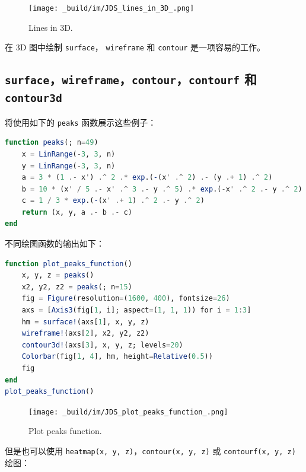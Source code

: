 \documentclass[
  notoc %
]{tufte-book}
\newcommand{\passthrough}[1]{#1}
\begin{document}
\begin{figure}
\hypertarget{fig:lines_in_3D}{%
\centering
\texttt{[image: \_build/im/JDS\_lines\_in\_3D\_.png]}
\caption{Lines in 3D.}\label{fig:lines_in_3D}
}
\end{figure}

在 3D 图中绘制 \passthrough{\lstinline!surface!}，
\passthrough{\lstinline!wireframe!} 和 \passthrough{\lstinline!contour!}
是一项容易的工作。

\hypertarget{surfacewireframecontourcontourf-ux548c-contour3d}{%
\subsection{\texorpdfstring{\texttt{surface}，\texttt{wireframe}，\texttt{contour}，\texttt{contourf}
和
\texttt{contour3d}}{surface，wireframe，contour，contourf 和 contour3d}}\label{surfacewireframecontourcontourf-ux548c-contour3d}}

将使用如下的 \passthrough{\lstinline!peaks!} 函数展示这些例子：

\begin{lstlisting}[language=Julia]
function peaks(; n=49)
    x = LinRange(-3, 3, n)
    y = LinRange(-3, 3, n)
    a = 3 * (1 .- x') .^ 2 .* exp.(-(x' .^ 2) .- (y .+ 1) .^ 2)
    b = 10 * (x' / 5 .- x' .^ 3 .- y .^ 5) .* exp.(-x' .^ 2 .- y .^ 2)
    c = 1 / 3 * exp.(-(x' .+ 1) .^ 2 .- y .^ 2)
    return (x, y, a .- b .- c)
end
\end{lstlisting}

不同绘图函数的输出如下：

\begin{lstlisting}[language=Julia]
function plot_peaks_function()
    x, y, z = peaks()
    x2, y2, z2 = peaks(; n=15)
    fig = Figure(resolution=(1600, 400), fontsize=26)
    axs = [Axis3(fig[1, i]; aspect=(1, 1, 1)) for i = 1:3]
    hm = surface!(axs[1], x, y, z)
    wireframe!(axs[2], x2, y2, z2)
    contour3d!(axs[3], x, y, z; levels=20)
    Colorbar(fig[1, 4], hm, height=Relative(0.5))
    fig
end
plot_peaks_function()
\end{lstlisting}

\begin{figure}
\hypertarget{fig:plot_peaks_function}{%
\centering
\texttt{[image: \_build/im/JDS\_plot\_peaks\_function\_.png]}
\caption{Plot peaks function.}\label{fig:plot_peaks_function}
}
\end{figure}

但是也可以使用
\passthrough{\lstinline!heatmap(x, y, z)!}，\passthrough{\lstinline!contour(x, y, z)!}
或 \passthrough{\lstinline!contourf(x, y, z)!} 绘图：
\end{document}

